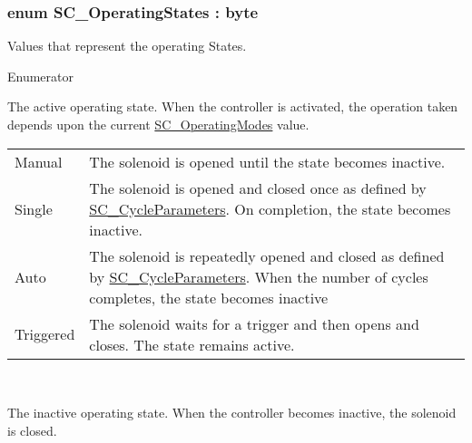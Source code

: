 \subsubsection[{\texorpdfstring{S\+C\+\_\+\+Operating\+States}{SC_OperatingStates}}]{\setlength{\rightskip}{0pt plus 5cm}enum {\bf S\+C\+\_\+\+Operating\+States} \+: byte}\hypertarget{group___t_cube_solenoid_ga461bf79287155a8e550ed5190d4cba21}{}\label{group___t_cube_solenoid_ga461bf79287155a8e550ed5190d4cba21}


Values that represent the operating States. 

\begin{Desc}
\item[Enumerator]\par
\begin{description}
\item[{\em 
S\+C\+\_\+\+Active\hypertarget{group___t_cube_solenoid_gga461bf79287155a8e550ed5190d4cba21acf7af4414d47e719c686d18777e18803}{}\label{group___t_cube_solenoid_gga461bf79287155a8e550ed5190d4cba21acf7af4414d47e719c686d18777e18803}
}]The active operating state. When the controller is activated, the operation taken depends upon the current \hyperlink{group___t_cube_solenoid_ga02b53b0f5b45f74b6b2da24cc6ff2895}{S\+C\+\_\+\+Operating\+Modes} value. \tabulinesep=1mm
\begin{longtabu} spread 0pt [c]{*2{|X[-1]}|}
\hline
Manual&The solenoid is opened until the state becomes inactive. \\
Single&The solenoid is opened and closed once as defined by \hyperlink{struct_s_c___cycle_parameters}{S\+C\+\_\+\+Cycle\+Parameters}. On completion, the state becomes inactive. \\
Auto&The solenoid is repeatedly opened and closed as defined by \hyperlink{struct_s_c___cycle_parameters}{S\+C\+\_\+\+Cycle\+Parameters}. When the number of cycles completes, the state becomes inactive \\
Triggered&The solenoid waits for a trigger and then opens and closes. The state remains active.  \\
\end{longtabu}
~\newline
 \item[{\em 
S\+C\+\_\+\+Inactive\hypertarget{group___t_cube_solenoid_gga461bf79287155a8e550ed5190d4cba21a112502feb0758ff14ff75aad18a94560}{}\label{group___t_cube_solenoid_gga461bf79287155a8e550ed5190d4cba21a112502feb0758ff14ff75aad18a94560}
}]The inactive operating state. When the controller becomes inactive, the solenoid is closed. \end{description}
\end{Desc}
